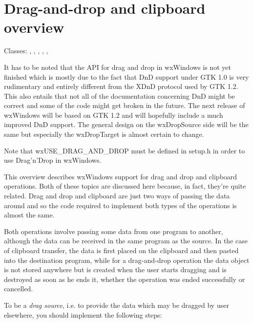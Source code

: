 \section{Drag-and-drop and clipboard overview}\label{wxdndoverview}

Classes: , 
, 
, 
, 
, 

It has to be noted that the API for drag and drop in wxWindows is not
yet finished which is mostly due to the fact that DnD support under
GTK 1.0 is very rudimentary and entirely different from the XDnD
protocol used by GTK 1.2. This also entails that not all of the documentation
concerning DnD might be correct and some of the code might get broken
in the future. The next release of wxWindows will be based on GTK 1.2
and will hopefully include a much improved DnD support. The general
design on the wxDropSource side will be the same but especially the
wxDropTarget is almost certain to change.

Note that wxUSE\_DRAG\_AND\_DROP must be defined in setup.h in order
to use Drag'n'Drop in wxWindows.

This overview describes wxWindows support for drag and drop and clipboard
operations. Both of these topics are discussed here because, in fact, they're
quite related. Drag and drop and clipboard are just two ways of passing the
data around and so the code required to implement both types of the operations
is almost the same.

Both operations involve passing some data from one program to another,
although the data can be received in the same program as the source. In the case
of clipboard transfer, the data is first placed on the clipboard and then
pasted into the destination program, while for a drag-and-drop operation the
data object is not stored anywhere but is created when the user starts
dragging and is destroyed as soon as he ends it, whether the operation was
ended successfully or cancelled.

To be a {\it drag source}, i.e. to provide the data which may be dragged by
user elsewhere, you should implement the following steps:

